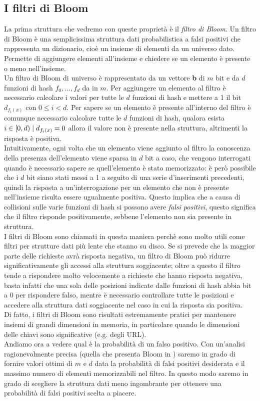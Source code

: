 \subsection{I filtri di Bloom}
La prima struttura che vedremo con queste proprietà è il \textit{filtro di Bloom}. Un filtro di Bloom \cite{Bloom} è una semplicissima struttura dati probabilistica a falsi positivi che rappresenta un dizionario, cioè un insieme di elementi da un universo dato. Permette di aggiungere elementi all'insieme e chiedere se un elemento è presente o meno nell'insieme.\\
Un filtro di Bloom di universo  è rappresentato da un vettore \textbf{b} di $m$ bit e da $d$ funzioni di hash $f_0, \dots, f_d$ da  in $m$. Per aggiungere un elemento al filtro è necessario calcolare i valori per tutte le $d$ funzioni di hash e mettere a 1 il bit $d_{f_i(x)}$ con $0 \leq i < d$. Per sapere se un elemento è presente all'interno del filtro è comunque necessario calcolare tutte le $d$ funzioni di hash, qualora esista $i \in [0, d) \hspace{1mm}|\hspace{1mm} d_{f_i(x)} = 0$ allora il valore non è presente nella struttura, altrimenti la risposta è positiva.\\
Intuitivamente, ogni volta che un elemento viene aggiunto al filtro la conoscenza della presenza dell'elemento viene sparsa in $d$ bit a caso, che vengono interrogati quando è necessario sapere se quell'elemento è stato memorizzato: è però possibile che i $d$ bit siano stati messi a 1 a seguito di una serie d'inserimenti precedenti, quindi la risposta a un'interrogazione per un elemento che non è presente nell'insieme risulta essere ugualmente positiva. Questo implica che a causa di collisioni sulle varie funzioni di hash si possono avere \textit{falsi positivi}, questo significa che il filtro risponde positivamente, sebbene l'elemento non sia presente in struttura.\\
I filtri di Bloom sono chiamati in questa maniera perchè sono molto utili come filtri per strutture dati più lente che stanno su disco. Se si prevede che la maggior parte delle richieste avrà risposta negativa, un filtro di Bloom può ridurre significativamente gli accessi alla struttura soggiacente; oltre a questo il filtro tende a rispondere molto velocemente a richieste che hanno risposta negativa, basta infatti che una sola delle posizioni indicate dalle funzioni di hash abbia bit a 0 per rispondere falso, mentre è necessario controllare tutte le posizioni e accedere alla struttura dati soggiacente nel caso in cui la risposta sia positiva.\\
Di fatto, i filtri di Bloom sono risultati estremamente pratici per mantenere insiemi di grandi dimensioni in memoria, in particolare quando le dimensioni delle chiavi sono significative (e.g. degli URL).\\
Andiamo ora a vedere qual è la probabilità di un falso positivo. Con un'analisi ragionevolmente precisa (quella che presenta Bloom in \cite{Bloom}) saremo in grado di fornire valori ottimi di $m$ e $d$ data la probabilità di falsi positivi desiderata e il massimo numero di elementi memorizzabili nel filtro. In questo modo saremo in grado di scegliere la struttura dati meno ingombrante per ottenere una probabilità di falsi positivi scelta a piacere.\\
